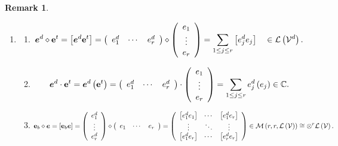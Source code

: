 \documentclass[aps,preprint]{revtex4}%
\newtheorem{remark}[theorem]{Remark}
\begin{document}
\begin{remark}
\begin{enumerate}
\item
\begin{enumerate}
\item
\begin{equation}
\boldsymbol{e}^{d}\diamond\mathbf{e}^{t}=\left[  \boldsymbol{e}^{d}%
\mathbf{e}^{t}\right]  =\left(
\begin{array}
[c]{ccc}%
e_{1}^{d} & \cdots & e_{r}^{d}%
\end{array}
\right)  \diamond\left(
\begin{array}
[c]{c}%
e_{1}\\
\vdots\\
e_{r}%
\end{array}
\right)  =\sum_{1\leq j\leq r}\left[  e_{j}^{d}e_{j}\right]  \quad
\in\mathcal{L}\left(  \mathcal{V}^{d}\right)  .
\end{equation}


\item
\begin{equation}
\boldsymbol{e}^{d}\cdot\mathbf{e}^{t}=\boldsymbol{e}^{d}\left(  \mathbf{e}%
^{t}\right)  =\left(
\begin{array}
[c]{ccc}%
e_{1}^{d} & \cdots & e_{r}^{d}%
\end{array}
\right)  \cdot\left(
\begin{array}
[c]{c}%
e_{1}\\
\vdots\\
e_{r}%
\end{array}
\right)  =\sum_{1\leq j\leq r}e_{j}^{d}\left(  e_{j}\right)  \in\mathbb{C}.
\end{equation}


\item
\begin{equation}
\mathbf{e}_{b}\diamond\boldsymbol{e}=\left[  \mathbf{e}_{b}\boldsymbol{e}%
\right]  =\left(
\begin{array}
[c]{c}%
e_{1}^{d}\\
\vdots\\
e_{r}^{d}%
\end{array}
\right)  \diamond\left(
\begin{array}
[c]{ccc}%
e_{1} & \cdots & e_{r}%
\end{array}
\right)  =\left(
\begin{array}
[c]{ccc}%
\left[  e_{1}^{d}e_{1}\right]  & \cdots & \left[  e_{1}^{d}e_{r}\right] \\
\vdots & \ddots & \vdots\\
\left[  e_{1}^{d}e_{r}\right]  & \cdots & \left[  e_{r}^{d}e_{r}\right]
\end{array}
\right)  \in\mathcal{M}\left(  r,r,\mathcal{L}\left(  \mathcal{V}\right)
\right)  \cong\otimes^{r}\mathcal{L}\left(  \mathcal{V}\right)  .
\end{equation}

\end{enumerate}
\end{enumerate}
\end{remark}
\end{document}
